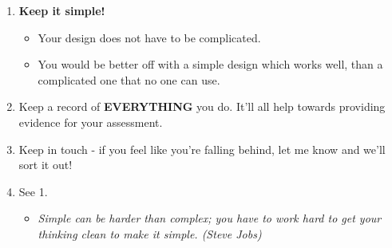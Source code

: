 \documentclass[10pt]{article}
\begin{document}
	\begin{enumerate}
		\item \textbf{Keep it simple!} 
		\begin{itemize}
			\item Your design does not have to be complicated. 
			\item You would be better off with a simple design which works well, than a complicated one that no one can use.
		\end{itemize}
		\item Keep a record of \textbf{EVERYTHING} you do. It'll all help towards providing evidence for your assessment.
		\item Keep in touch - if you feel like you're falling behind, let me know and we'll sort it out!
		\item See 1.  
		\begin{itemize}
			\item \textit{Simple can be harder than complex; you have to work hard to get your thinking clean to make it simple. (Steve Jobs)}
		\end{itemize}
	\end{enumerate}
	
\end{document}
